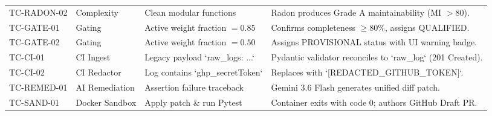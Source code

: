 \begin{longtable}{p{} p{} p{} p{}}
\addlinespace
TC-RADON-02 & Complexity & Clean modular functions & Radon produces Grade A maintainability (MI $>80$). \\
\addlinespace
TC-GATE-01 & Gating & Active weight fraction $=0.85$ & Confirms completeness $\ge 80\%$, assigns QUALIFIED. \\
\addlinespace
TC-GATE-02 & Gating & Active weight fraction $=0.50$ & Assigns PROVISIONAL status with UI warning badge. \\
\addlinespace
TC-CI-01 & CI Ingest & Legacy payload `{raw\_logs: ...}` & Pydantic validator reconciles to `raw\_log` (201 Created). \\
\addlinespace
TC-CI-02 & CI Redactor & Log contains `ghp\_secretToken` & Replaces with `[REDACTED\_GITHUB\_TOKEN]`. \\
\addlinespace
TC-REMED-01 & AI Remediation & Assertion failure traceback & Gemini 3.6 Flash generates unified diff patch. \\
\addlinespace
TC-SAND-01 & Docker Sandbox & Apply patch \& run Pytest & Container exits with code 0; authors GitHub Draft PR. \\
\end{longtable}

